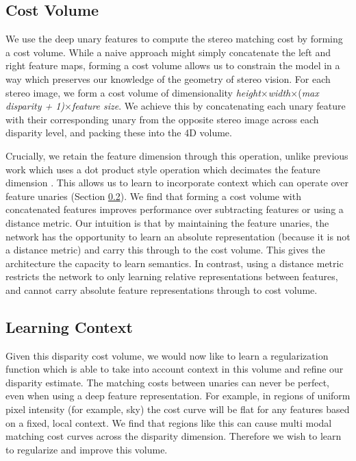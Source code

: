 \subsection{Cost Volume}
\label{sec:cost_vol}

We use the deep unary features to compute the stereo matching cost by forming a cost volume. While a naive approach might simply concatenate the left and right feature maps, forming a cost volume allows us to constrain the model in a way which preserves our knowledge of the geometry of stereo vision. For each stereo image, we form a cost volume of dimensionality {\it height}$\times${\it width}$\times${(\it max disparity + 1)}$\times${\it feature size}. We achieve this by concatenating each unary feature with their corresponding unary from the opposite stereo image across each disparity level, and packing these into the 4D volume. 

Crucially, we retain the feature dimension through this operation, unlike previous work which uses a dot product style operation which decimates the feature dimension \citep{luo2016efficient}. This allows us to learn to incorporate context which can operate over feature unaries (Section \ref{sec:regularise}). We find that forming a cost volume with concatenated features improves performance over subtracting features or using a distance metric. Our intuition is that by maintaining the feature unaries, the network has the opportunity to learn an absolute representation (because it is not a distance metric) and carry this through to the cost volume. This gives the architecture the capacity to learn semantics. In contrast, using a distance metric restricts the network to only learning relative representations between features, and cannot carry absolute feature representations through to cost volume.

\subsection{Learning Context}
\label{sec:regularise}

Given this disparity cost volume, we would now like to learn a regularization function which is able to take into account context in this volume and refine our disparity estimate. The matching costs between unaries can never be perfect, even when using a deep feature representation. For example, in regions of uniform pixel intensity (for example, sky) the cost curve will be flat for any features based on a fixed, local context.  We find that regions like this can cause multi modal matching cost curves across the disparity dimension. Therefore we wish to learn to regularize and improve this volume.

